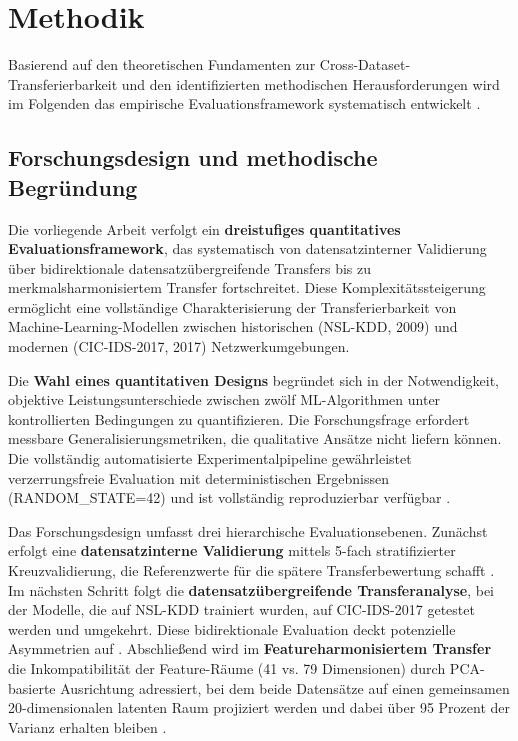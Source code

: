 \documentclass[11pt,a4paper]{article}
\begin{document}
    \section{Methodik}

    Basierend auf den theoretischen Fundamenten zur Cross-Dataset-Transferierbarkeit und den identifizierten methodischen Herausforderungen wird im Folgenden das empirische Evaluationsframework systematisch entwickelt \parencite{Weirauch2025}.

    \subsection{Forschungsdesign und methodische Begründung}

    Die vorliegende Arbeit verfolgt ein \textbf{dreistufiges quantitatives Evaluationsframework}, das systematisch von datensatzinterner Validierung über bidirektionale datensatzübergreifende Transfers bis zu merkmalsharmonisiertem Transfer fortschreitet. Diese Komplexitätssteigerung ermöglicht eine vollständige Charakterisierung der Transferierbarkeit von Machine-Learning-Modellen zwischen historischen (NSL-KDD, 2009) und modernen (CIC-IDS-2017, 2017) Netzwerkumgebungen.

    Die \textbf{Wahl eines quantitativen Designs} begründet sich in der Notwendigkeit, objektive Leistungsunterschiede zwischen zwölf ML-Algorithmen unter kontrollierten Bedingungen zu quantifizieren. Die Forschungsfrage erfordert messbare Generalisierungsmetriken, die qualitative Ansätze nicht liefern können. Die vollständig automatisierte Experimentalpipeline gewährleistet verzerrungsfreie Evaluation mit deterministischen Ergebnissen (RANDOM\_STATE=42) und ist vollständig reproduzierbar verfügbar \parencite{Weirauch2025}.

    Das Forschungsdesign umfasst drei hierarchische Evaluationsebenen. Zunächst erfolgt eine \textbf{datensatzinterne Validierung} mittels 5-fach stratifizierter Kreuzvalidierung, die Referenzwerte für die spätere Transferbewertung schafft \parencite{Tavallaee2009}. Im nächsten Schritt folgt die \textbf{datensatzübergreifende Transferanalyse}, bei der Modelle, die auf NSL-KDD trainiert wurden, auf CIC-IDS-2017 getestet werden und umgekehrt. Diese bidirektionale Evaluation deckt potenzielle Asymmetrien auf \parencite{Ring2019}. Abschließend wird im \textbf{Featureharmonisiertem Transfer} die Inkompatibilität der Feature-Räume (41 vs. 79 Dimensionen) durch PCA-basierte Ausrichtung adressiert, bei dem beide Datensätze auf einen gemeinsamen 20-dimensionalen latenten Raum projiziert werden und dabei über 95 Prozent der Varianz erhalten bleiben \parencite{Goodfellow2016}.
\end{document}
